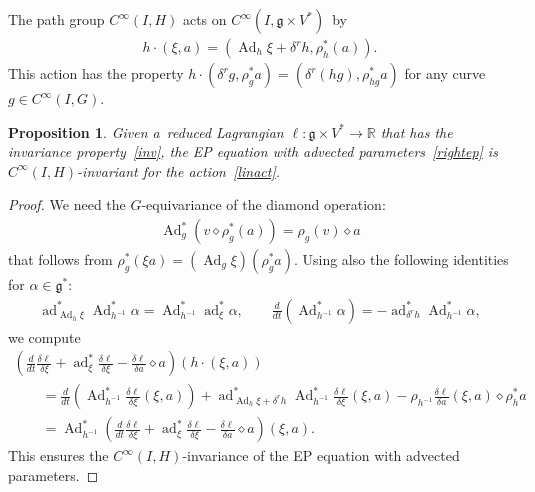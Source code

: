 \documentclass[10pt,a4paper]{amsart}
\numberwithin{equation}{section}
\newtheorem{Proposition}[Theorem]{Proposition}
{ \theoremstyle{definition}
\newtheorem{Example}[Theorem]{Example}
\newtheorem{Remark}[Theorem]{Remark} }
\begin{document}
The path group $C^{\infty}(I,H)$ acts on $C^{\infty}(I,\mathfrak g\times V^*)$~by
\begin{gather}
\label{linact}
h\cdot (\xi,a)=(\operatorname{Ad}_h\xi+\delta^rh,\rho^*_h(a)).
\end{gather}
This action has the property $h\cdot(\delta^rg,\rho^*_ga)=(\delta^r(hg),\rho^*_{hg}{a})$ for any curve $g\in
C^{\infty}(I,G)$.


\begin{Proposition}
\label{thmlinear}
Given a~reduced Lagrangian $\ell:\mathfrak g\times V^*\to\mathbb R$ that has the invariance pro\-per\-ty~\eqref{inv}, the EP
equation with advected parameters~\eqref{rightep} is $C^{\infty}(I,H)$-invariant for the action~\eqref{linact}.
\end{Proposition}



\begin{proof}
We need the $G$-equivariance of the diamond operation:
\begin{gather*}
\operatorname{Ad}^*_g(v\diamond\rho^*_g(a))=\rho_g(v)\diamond a
\end{gather*}
that follows from $\rho^*_g(\xi a)=(\operatorname{Ad}_g\xi)(\rho^*_ga)$.
Using also the following identities for $\alpha\in\mathfrak g^*$:
\begin{gather*}
\operatorname{ad}^*_{\operatorname{Ad}_h\xi}\operatorname{Ad}^*_{h^{-1}}\alpha=\operatorname{Ad}^*_{h^{-1}}\operatorname{ad}^*_\xi\alpha,
\qquad
\frac{d}{dt}(\operatorname{Ad}^*_{h^{-1}}\alpha) =-\operatorname{ad}^*_{\delta^rh}\operatorname{Ad}^*_{h^{-1}}\alpha,
\end{gather*}
we compute
\begin{gather*}
\left(\frac{d}{dt}\frac{\delta\ell}{\delta\xi}+\operatorname{ad}^*_\xi\frac{\delta
\ell}{\delta\xi}-\frac{\delta\ell}{\delta a}\diamond a\right)(h\cdot(\xi,a))
\\
\qquad
=\frac{d}{dt}\left(\operatorname{Ad}^*_{h^{-1}}\frac{\delta \ell}{\delta\xi}(\xi,a)\right)
+\operatorname{ad}^*_{\operatorname{Ad}_h\xi+\delta^rh}\operatorname{Ad}^*_{h^{-1}}\frac{\delta\ell}{\delta\xi}(\xi,a)
-\rho_{h^{-1}}\frac{\delta\ell}{\delta a}(\xi,a)\diamond\rho^*_ha
\\
\qquad
=\operatorname{Ad}^*_{h^{-1}}\left(\frac{d}{dt}\frac{\delta\ell}{\delta\xi}+\operatorname{ad}^*_\xi\frac{\delta
\ell}{\delta\xi}-\frac{\delta\ell}{\delta a}\diamond a\right)(\xi,a).
\end{gather*}
This ensures the $C^{\infty}(I,H)$-invariance of the EP equation with advected parameters.
\end{proof}
\end{document}

